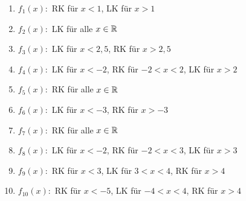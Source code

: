\begin{Answer}[ref=kruemmungA1]
	\begin{enumerate}[label=\alph*)]
		\item \(f_1(x):\) RK für \(x<1\), LK für \(x>1\)
		\item \(f_2(x):\) LK für alle \(x\in \mathbb{R}\)
		\item \(f_3(x):\) LK für \(x<2,5\), RK für \(x>2,5\)
		\item \(f_4(x):\) LK für \(x<-2\), RK für \(-2<x<2\), LK für \(x>2\)
		\item \(f_5(x):\) RK für alle \(x\in \mathbb{R}\)
		\item \(f_6(x):\) LK für \(x<-3\), RK für \(x>-3\)
		\item \(f_7(x):\) RK für alle \(x\in \mathbb{R}\)
		\item \(f_8(x):\) LK für \(x<-2\), RK für \(-2<x<3\), LK für \(x>3\)
		\item \(f_9(x):\) RK für \(x<3\), LK für \(3<x<4\), RK für \(x>4\)
		\item \(f_{10}(x):\) RK für \(x<-5\), LK für \(-4<x<4\), RK für \(x>4\)
	\end{enumerate}
\end{Answer}